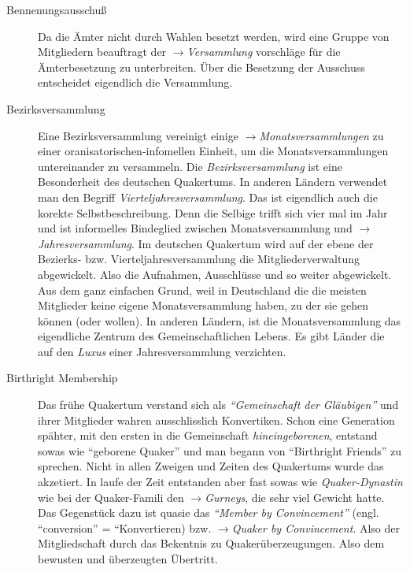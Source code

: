 \begin{description}
 \item[Bennenungsausschuß] Da die Ämter nicht durch Wahlen besetzt werden, wird
eine Gruppe von Mitgliedern beauftragt der $\to$\textit{Versammlung} vorschläge
für die Ämterbesetzung zu unterbreiten. Über die Besetzung der Ausschuss
entscheidet eigendlich die Versammlung. 
 
 \item[Bezirksversammlung] Eine Bezirksversammlung vereinigt einige
$\to$\textit{Monatsversammlungen} zu einer oranisatorischen-infomellen Einheit,
um die Monatsversammlungen untereinander zu versammeln. Die
\textit{Bezirksversammlung} ist eine Besonderheit des deutschen Quakertums. In
anderen Ländern verwendet man den Begriff \textit{Vierteljahresversammlung}. Das
ist eigendlich auch die korekte Selbstbeschreibung. Denn die Selbige trifft sich
vier mal im Jahr und ist informelles Bindeglied zwischen Monatsversammlung und
$\to$\textit{Jahresversammlung}. Im deutschen Quakertum wird auf der ebene der
Bezierks- bzw. Vierteljahresversammlung die Mitgliederverwaltung abgewickelt.
Also die Aufnahmen, Ausschlüsse und so weiter abgewickelt. Aus dem ganz
einfachen Grund, weil in Deutschland die die meisten Mitglieder keine eigene
Monatsversammlung haben, zu der sie gehen können (oder wollen). In anderen
Ländern, ist die Monatsversammlung das eigendliche Zentrum des
Gemeinschaftlichen Lebens. Es gibt Länder die auf den \textit{Luxus} einer
Jahresversammlung verzichten.
 
 \item[Birthright Membership] Das frühe Quakertum verstand sich als
\textit{"`Gemeinschaft der Gläubigen"'} und ihrer Mitglieder wahren
ausschlisslich Konvertiken. Schon eine Generation spähter, mit den ersten in die
Gemeinschaft \textit{hineingeborenen}, entstand sowas wie "`geborene Quaker"'
und man begann von "`Birthright Friends"' zu sprechen. Nicht in allen Zweigen
und Zeiten des Quakertums wurde das akzetiert. In laufe der Zeit entstanden aber
fast sowas wie \textit{Quaker-Dynastin} wie bei der Quaker-Famili den
$\to$\textit{Gurneys}, die sehr viel Gewicht hatte. Das Gegenstück dazu ist
quasie das \textit{"`Member by Convincement"'} (engl. ``conversion'' =
``Konvertieren) bzw. $\to$\textit{Quaker by Convincement}. Also der
Mitgliedschaft durch das Bekentnis zu Quakerüberzeugungen. Also dem bewusten und
überzeugten Übertritt.
 

\end{description}
